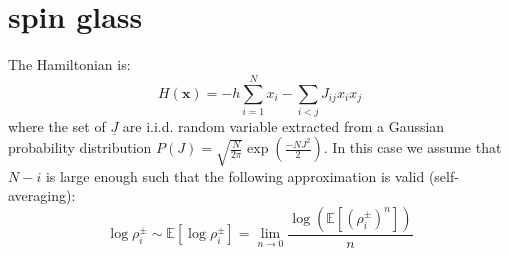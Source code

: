 \documentclass{article}
\begin{document}
\section{spin glass}
The Hamiltonian is:
\begin{equation}
H\left(\mathbf{x}\right)=-h\sum_{i=1}^{N}x_{i}-\sum_{i<j}J_{ij}x_{i}x_{j}
\end{equation}
where the set of $\underline{J}$ are i.i.d. random variable extracted from a Gaussian probability distribution $P(J)=\sqrt{\frac{N}{2\pi}}\exp\left(\frac{-NJ^2}{2}  \right)$. In this case 
we assume that $N-i$ is large enough such that the following approximation is valid (self-averaging): 
\[
\log\rho_i^{\pm} \sim \mathbb{E}\left[  \log\rho_i^{\pm} \right] = \lim_{n\rightarrow 0} \frac{  \log(\mathbb{E}\left[(\rho_i^{\pm})^n \right])}{n}
\]
\end{document}
